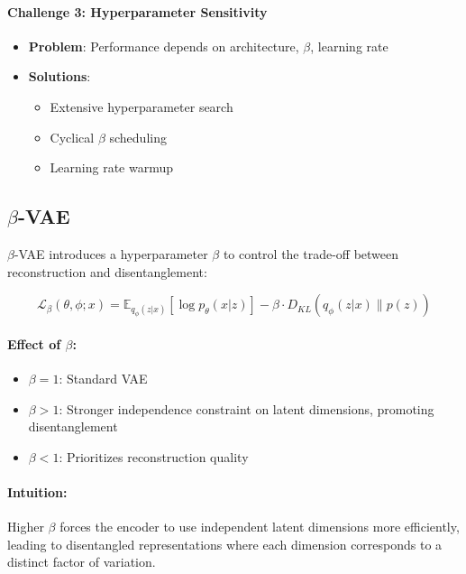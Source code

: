 \documentclass[conference]{IEEEtran}
\begin{document}
\paragraph{Challenge 3: Hyperparameter Sensitivity}
\begin{itemize}
    \item \textbf{Problem}: Performance depends on architecture, $\beta$, learning rate
    \item \textbf{Solutions}:
    \begin{itemize}
        \item Extensive hyperparameter search
        \item Cyclical $\beta$ scheduling
        \item Learning rate warmup
    \end{itemize}
\end{itemize}

\subsection{$\beta$-VAE}

$\beta$-VAE introduces a hyperparameter $\beta$ to control the trade-off between reconstruction and disentanglement:

\begin{equation}
\mathcal{L}_{\beta}(\theta, \phi; x) = \mathbb{E}_{q_\phi(z|x)} \left[ \log p_\theta(x|z) \right] - \beta \cdot D_{KL}(q_\phi(z|x) \| p(z))
\end{equation}

\paragraph{Effect of $\beta$:}
\begin{itemize}
    \item $\beta = 1$: Standard VAE
    \item $\beta > 1$: Stronger independence constraint on latent dimensions, promoting disentanglement
    \item $\beta < 1$: Prioritizes reconstruction quality
\end{itemize}

\paragraph{Intuition:} Higher $\beta$ forces the encoder to use independent latent dimensions more efficiently, leading to disentangled representations where each dimension corresponds to a distinct factor of variation.
\end{document}
